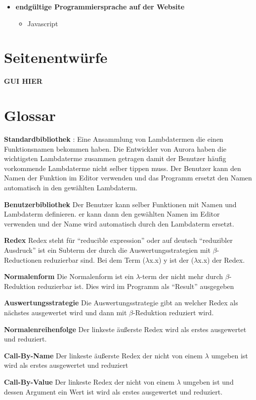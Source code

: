 \documentclass[parskip=full,11pt,twoside]{scrartcl}
\begin{document}
\begin{description}
\begin{itemize}
\begin{itemize}
			\end{itemize}
		\item \textbf{endgültige Programmiersprache auf der Website}
			\begin{itemize}
				\item Javascript
			\end{itemize}
	\end{itemize}
\newpage
\appendix
\end{description}
\section{Seitenentwürfe}
\textbf{GUI HIER}



\section{Glossar}

\textbf{Standardbibliothek} :
Eine Ansammlung von Lambdatermen die einen Funktionsnamen bekommen haben. Die Entwickler von Aurora haben die wichtigsten Lambdaterme zusammen getragen damit der Benutzer häufig vorkommende Lambdaterme nicht selber tippen muss. Der Benutzer kann den Namen der Funktion im Editor verwenden und das Programm ersetzt den Namen automatisch in den gewählten Lambdaterm.

\textbf{Benutzerbibliothek}
Der Benutzer kann selber Funktionen mit Namen und Lambdaterm definieren. er kann dann den gewählten Namen im Editor verwenden und der Name wird automatisch durch den Lambdaterm ersetzt.

\textbf {Redex}
Redex steht für \enquote{reducible expression} oder auf deutsch \enquote{reduzibler Ausdruck} ist ein Subterm der durch die Auswertungsstrategien mit $\beta$-Reductionen reduzierbar sind.
Bei dem Term ($\lambda$x.x) y ist der ($\lambda$x.x) der Redex.

\textbf{Normalenform}
Die Normalenform ist ein $\lambda$-term der nicht mehr durch $\beta$-Reduktion reduzierbar ist. Dies wird im Programm als \enquote{Result} ausgegeben

\textbf{Auswertungsstrategie}
Die Auswertungsstrategie gibt an welcher Redex als nächstes ausgewertet wird und dann mit $\beta$-Reduktion reduziert wird.

\textbf{Normalenreihenfolge}
Der linkeste äußerste Redex wird als erstes ausgewertet und reduziert.

\textbf{Call-By-Name}
Der linkeste äußerste Redex der nicht von einem $\lambda$ umgeben ist wird als erstes ausgewertet und reduziert

\textbf{Call-By-Value}
Der linkeste Redex der nicht von einem $\lambda$ umgeben ist und dessen Argument ein Wert ist wird als erstes ausgewertet und reduziert.
 
\end{document}
